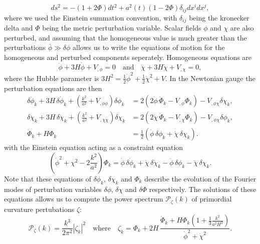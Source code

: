 \begin{equation}
    ds^2 = -(1 + 2\Phi)dt^2 + a^2(t)(1 - 2 \Phi) \delta_{ij}dx^i dx^j,
\end{equation}
where we used the Einstein summation convention, with $\delta_{ij}$ being the kronecker delta and $\Phi$ being the metric perturbation variable. Scalar fields $\phi$ and $\chi$ are also perturbed,  and assuming that the homogeneous value is much greater than the perturbations $\bar{\phi} \gg \delta \phi$ allows us to write the equations of motion for the homogeneous and perturbed components seperately. Homogeneous equations are
\begin{equation}
    \ddot{\phi} + 3H \dot{\phi} + V_{, \phi} = 0 \quad \text{and} \quad \ddot{\chi} + 3H \dot{\chi} + V_{, \chi} = 0,
\end{equation}
where the Hubble parameter is $3H^2 = \frac{1}{2}\dot{\phi}^2 + \frac{1}{2}\dot{\chi}^2 + V$. In the Newtonian gauge the perturbation equations are then
\begin{align}
\delta \ddot{\phi}_k + 3H\,\delta \dot{\phi}_k
+ \left(\frac{k^2}{a^2} + V_{,\phi\phi}\right)\delta \phi_k
&= 2\left(2\dot{\phi}\,\dot{\Phi}_k - V_{,\phi}\Phi_k\right) - V_{,\phi\chi}\delta \chi_k, \\[6pt]
\delta \ddot{\chi}_k + 3H\,\delta \dot{\chi}_k
+ \left(\frac{k^2}{a^2} + V_{,\chi\chi}\right)\delta \chi_k
&= 2\left(2\dot{\chi}\,\dot{\Phi}_k - V_{,\chi}\Phi_k\right) - V_{,\phi\chi}\delta \phi_k, \\[6pt]
\dot{\Phi}_k + H\Phi_k
&= \frac{1}{2}\left(\dot{\phi}\,\delta \phi_k + \dot{\chi}\,\delta \chi_k\right).
\end{align}
with the Einstein equation acting as a constraint equation
\begin{equation}
\left(\dot{\phi}^{2} + \chi^{2} - 2\frac{k^{2}}{a^{2}}\right)\Phi_{k}
= \dot{\phi}\,\delta\dot{\phi}_{k} + \dot{\chi}\,\delta\dot{\chi}_{k}
- \ddot{\phi}\,\delta\phi_{k} - \ddot{\chi}\,\delta\chi_{k}.
\end{equation}
Note that these equations of $\delta \phi_k$, $\delta \chi_k$ and $\Phi_k$ describe the evolution of the Fourier modes of perturbation variables $\delta \phi$, $\delta \chi$ and $\delta \Phi$ respectively. The solutions of these equations allows us to compute the power spectrum $\mathcal{P}_{\zeta}(k)$ of primordial curvature pertubations $\zeta$:
\begin{equation*}
    \mathcal{P}_{\zeta}(k) = \frac{k^3}{2 \pi^2} |\zeta_k|^2 \quad \text{where} \quad \zeta_k
= \Phi_k + 2H\,\frac{\dot{\Phi}_k + H\Phi_k\left(1+\frac{1}{3}\frac{k^2}{a^2H^2}\right)}
{\dot{\phi}^2 + \dot{\chi}^2}. 
\end{equation*}

